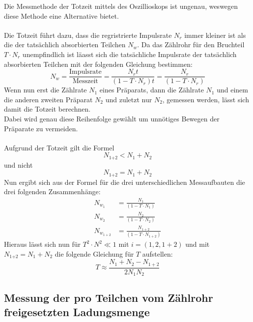 \noindent
Die Messmethode der Totzeit mittels des Oszillioskops ist ungenau, weswegen diese Methode eine Alternative bietet.\\\\
Die Totzeit führt dazu, dass die regristrierte Impulsrate $N_r$ immer kleiner ist als die der tatsächlich absorbierten Teilchen $N_w$.
Da das Zählrohr für den Bruchteil $T\cdot N_r $ unempfindlich ist läasst sich die tatsächliche Impulsrate der tatsächlich absorbierten Teilchen mit der folgenden Gleichung bestimmen:
\begin{equation}
    N_w=\frac{\text{Impulsrate}}{\text{Messzeit}}=\frac{N_r t}{(1-T \cdot N_r)t}=\frac{N_r }{(1-T \cdot N_r)}
    \label{eqn:imp}
\end{equation}
Wenn nun erst die Zählrate $N_1$ eines Präparats, dann die Zählrate $N_1$ und einem die anderen zweiten Präparat $N_2$ und zuletzt nur $N_2$, gemessen werden, lässt sich damit die Totzeit berechnen.\\
Dabei wird genau diese Reihenfolge gewählt um unnötiges Bewegen  der Präparate zu vermeiden.\\\\
Aufgrund der Totzeit gilt die Formel
\begin{equation*}
    N_\text{1+2}<N_1 +N_2
\end{equation*}
und nicht
\begin{equation*}
    N_\text{1+2}=N_1 +N_2
\end{equation*}
Nun ergibt sich aus der Formel  für die drei unterschiedlichen Messaufbauten die drei folgenden Zusammenhänge:
\begin{align*}
    N_{w_1} &=\frac{N_1 }{(1-T \cdot N_1)}\\
    N_{w_2} &=\frac{N_2 }{(1-T \cdot N_2)}\\
    N_{w_{1+2}} &=\frac{N_{1+2} }{(1-T \cdot N_{1+2})}
\end{align*}
Hieraus lässt sich nun für $T^2\cdot N^2 \ll 1$ mit $i=(1,2,1+2)$ und mit $N_\text{1+2}=N_1 +N_2$ die folgende Gleichung für $T$ aufstellen:
\begin{equation*}
    T\approx \frac{N_1 +N_2 -N_{{1+2}} }{2 N_1 N_2}
\end{equation*}

\subsection{Messung der pro Teilchen vom Zählrohr freigesetzten Ladungsmenge}


